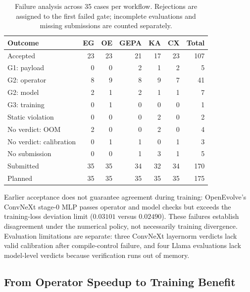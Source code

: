 \begin{table}[t]
\centering
\caption{Failure analysis across 35 cases per workflow. Rejections are assigned to the first failed gate; incomplete evaluations and missing submissions are counted separately.}

\label{tab:failure_summary}
\scriptsize
\setlength{\tabcolsep}{2pt}
\begin{tabular*}{\columnwidth}{@{\extracolsep{\fill}}lrrrrrr@{}}
\toprule
Outcome & EG & OE & GEPA & KA & CX & Total \\
\midrule
Accepted & 23 & 23 & 21 & 17 & 23 & 107 \\
G1: payload & 0 & 0 & 2 & 1 & 2 & 5 \\
G2: operator & 8 & 9 & 8 & 9 & 7 & 41 \\
G2: model & 2 & 1 & 2 & 1 & 1 & 7 \\
G3: training & 0 & 1 & 0 & 0 & 0 & 1 \\
Static violation & 0 & 0 & 0 & 2 & 0 & 2 \\
No verdict: OOM & 2 & 0 & 0 & 2 & 0 & 4 \\
No verdict: calibration & 0 & 1 & 1 & 0 & 1 & 3 \\
No submission & 0 & 0 & 1 & 3 & 1 & 5 \\
\midrule
Submitted & 35 & 35 & 34 & 32 & 34 & 170 \\
Planned & 35 & 35 & 35 & 35 & 35 & 175 \\
\bottomrule
\end{tabular*}
\end{table}


Earlier acceptance does not guarantee agreement during training: OpenEvolve's ConvNeXt stage-0 MLP passes operator and model checks but exceeds the training-loss deviation limit ($0.03101$ versus $0.02490$). These failures establish disagreement under the numerical policy, not necessarily training divergence. Evaluation limitations are separate: three ConvNeXt layernorm verdicts lack valid calibration after compile-control failure, and four Llama evaluations lack model-level verdicts because verification runs out of memory.


\subsection{From Operator Speedup to Training Benefit}
\label{sec:cross-tier}

